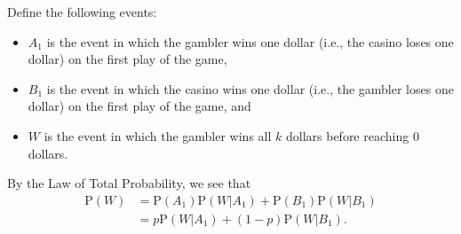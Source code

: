 \documentclass[a4paper,11pt]{article}
\newcommand{\Prob}{\mathrm{P}}
\begin{document}
Define the following events:
\begin{itemize}
\item $A_1$ is the event in which the gambler wins one dollar (i.e., the casino loses one dollar) on the first play of the game,
\item $B_1$ is the event in which the casino wins one dollar (i.e., the gambler loses one dollar) on the first play of the game, and
\item $W$ is the event in which the gambler wins all $k$ dollars before reaching $0$ dollars.
\end{itemize}

By the Law of Total Probability, we see that
\begin{eqnarray}
\Prob(W)&=\Prob(A_1)\Prob(W|A_1)+\Prob(B_1)\Prob(W|B_1) \nonumber 
\\
&=p\Prob(W|A_1)+(1-p)\Prob(W|B_1). \nonumber 
\end{eqnarray}
\end{document}
